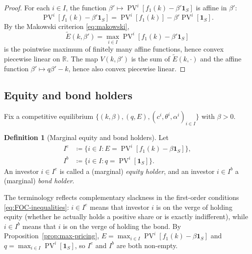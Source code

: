 \documentclass[11pt,a4paper,oneside]{book}
\def\R{\mathbb{R}}
\def\1{\mathbf{1}}
\DeclareMathOperator{\PV}{PV}
\theoremstyle{plain}
\theoremstyle{definition}
\newtheorem{definition}[theorem]{Definition}
\theoremstyle{remark}
\numberwithin{equation}{chapter}
\begin{document}
\begin{proof}
For each $i \in I$, the function $\beta' \mapsto \PV^i[f_1(k) - \beta' \1_S]$ is affine in $\beta'$:
\begin{equation*}
  \PV^i[f_1(k) - \beta' \1_S] = \PV^i[f_1(k)] - \beta' \PV^i[\1_S].
\end{equation*}
By the Makowski criterion \eqref{eq:makowski},
\begin{equation*}
  \widetilde{E}(k, \beta') = \max_{i \in I} \PV^i[f_1(k) - \beta' \1_S]
\end{equation*}
is the pointwise maximum of finitely many affine functions, hence convex piecewise linear on $\R$.
The map $V(k, \beta')$ is the sum of $\widetilde{E}(k, \cdot)$ and the affine function $\beta' \mapsto q\beta' - k$, hence also convex piecewise linear.
\end{proof}

\subsection{Equity and bond holders}

Fix a competitive equilibrium $\bigl\{ (k, \beta), (q, E), (c^i, \theta^i, \alpha^i)_{i \in I} \bigr\}$ with $\beta > 0$.

\begin{definition}[Marginal equity and bond holders]\label{def:marginal-holders}
Let
\begin{align*}
  I^e &\coloneqq \bigl\{ i \in I \colon E = \PV^i[f_1(k) - \beta \1_S] \bigr\}, \\
  I^b &\coloneqq \bigl\{ i \in I \colon q = \PV^i[\1_S] \bigr\}.
\end{align*}
An investor $i \in I^e$ is called a (marginal) \emph{equity holder}, and an investor $i \in I^b$ a (marginal) \emph{bond holder}.
\end{definition}

The terminology reflects complementary slackness in the first-order conditions \eqref{eq:FOC-inequalities}: $i \in I^e$ means that investor $i$ is on the verge of holding equity (whether he actually holds a positive share or is exactly indifferent), while $i \in I^b$ means that $i$ is on the verge of holding the bond.
By Proposition~\ref{prop:max-pricing}, $E = \max_{i \in I} \PV^i[f_1(k) - \beta \1_S]$ and $q = \max_{i \in I} \PV^i[\1_S]$, so $I^e$ and $I^b$ are both non-empty.

\end{document}
